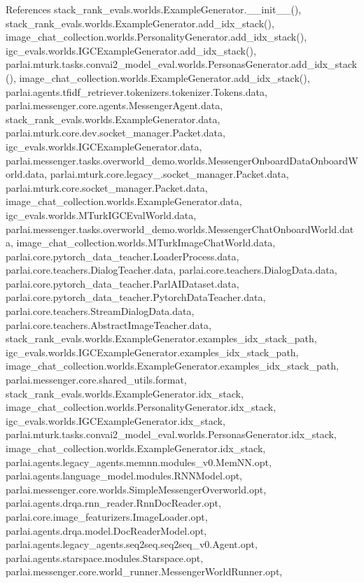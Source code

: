 References stack\+\_\+rank\+\_\+evals.\+worlds.\+Example\+Generator.\+\_\+\+\_\+init\+\_\+\+\_\+(), stack\+\_\+rank\+\_\+evals.\+worlds.\+Example\+Generator.\+add\+\_\+idx\+\_\+stack(), image\+\_\+chat\+\_\+collection.\+worlds.\+Personality\+Generator.\+add\+\_\+idx\+\_\+stack(), igc\+\_\+evals.\+worlds.\+I\+G\+C\+Example\+Generator.\+add\+\_\+idx\+\_\+stack(), parlai.\+mturk.\+tasks.\+convai2\+\_\+model\+\_\+eval.\+worlds.\+Personas\+Generator.\+add\+\_\+idx\+\_\+stack(), image\+\_\+chat\+\_\+collection.\+worlds.\+Example\+Generator.\+add\+\_\+idx\+\_\+stack(), parlai.\+agents.\+tfidf\+\_\+retriever.\+tokenizers.\+tokenizer.\+Tokens.\+data, parlai.\+messenger.\+core.\+agents.\+Messenger\+Agent.\+data, stack\+\_\+rank\+\_\+evals.\+worlds.\+Example\+Generator.\+data, parlai.\+mturk.\+core.\+dev.\+socket\+\_\+manager.\+Packet.\+data, igc\+\_\+evals.\+worlds.\+I\+G\+C\+Example\+Generator.\+data, parlai.\+messenger.\+tasks.\+overworld\+\_\+demo.\+worlds.\+Messenger\+Onboard\+Data\+Onboard\+World.\+data, parlai.\+mturk.\+core.\+legacy\+\_.\+socket\+\_\+manager.\+Packet.\+data, parlai.\+mturk.\+core.\+socket\+\_\+manager.\+Packet.\+data, image\+\_\+chat\+\_\+collection.\+worlds.\+Example\+Generator.\+data, igc\+\_\+evals.\+worlds.\+M\+Turk\+I\+G\+C\+Eval\+World.\+data, parlai.\+messenger.\+tasks.\+overworld\+\_\+demo.\+worlds.\+Messenger\+Chat\+Onboard\+World.\+data, image\+\_\+chat\+\_\+collection.\+worlds.\+M\+Turk\+Image\+Chat\+World.\+data, parlai.\+core.\+pytorch\+\_\+data\+\_\+teacher.\+Loader\+Process.\+data, parlai.\+core.\+teachers.\+Dialog\+Teacher.\+data, parlai.\+core.\+teachers.\+Dialog\+Data.\+data, parlai.\+core.\+pytorch\+\_\+data\+\_\+teacher.\+Parl\+A\+I\+Dataset.\+data, parlai.\+core.\+pytorch\+\_\+data\+\_\+teacher.\+Pytorch\+Data\+Teacher.\+data, parlai.\+core.\+teachers.\+Stream\+Dialog\+Data.\+data, parlai.\+core.\+teachers.\+Abstract\+Image\+Teacher.\+data, stack\+\_\+rank\+\_\+evals.\+worlds.\+Example\+Generator.\+examples\+\_\+idx\+\_\+stack\+\_\+path, igc\+\_\+evals.\+worlds.\+I\+G\+C\+Example\+Generator.\+examples\+\_\+idx\+\_\+stack\+\_\+path, image\+\_\+chat\+\_\+collection.\+worlds.\+Example\+Generator.\+examples\+\_\+idx\+\_\+stack\+\_\+path, parlai.\+messenger.\+core.\+shared\+\_\+utils.\+format, stack\+\_\+rank\+\_\+evals.\+worlds.\+Example\+Generator.\+idx\+\_\+stack, image\+\_\+chat\+\_\+collection.\+worlds.\+Personality\+Generator.\+idx\+\_\+stack, igc\+\_\+evals.\+worlds.\+I\+G\+C\+Example\+Generator.\+idx\+\_\+stack, parlai.\+mturk.\+tasks.\+convai2\+\_\+model\+\_\+eval.\+worlds.\+Personas\+Generator.\+idx\+\_\+stack, image\+\_\+chat\+\_\+collection.\+worlds.\+Example\+Generator.\+idx\+\_\+stack, parlai.\+agents.\+legacy\+\_\+agents.\+memnn.\+modules\+\_\+v0.\+Mem\+N\+N.\+opt, parlai.\+agents.\+language\+\_\+model.\+modules.\+R\+N\+N\+Model.\+opt, parlai.\+messenger.\+core.\+worlds.\+Simple\+Messenger\+Overworld.\+opt, parlai.\+agents.\+drqa.\+rnn\+\_\+reader.\+Rnn\+Doc\+Reader.\+opt, parlai.\+core.\+image\+\_\+featurizers.\+Image\+Loader.\+opt, parlai.\+agents.\+drqa.\+model.\+Doc\+Reader\+Model.\+opt, parlai.\+agents.\+legacy\+\_\+agents.\+seq2seq.\+seq2seq\+\_\+v0.\+Agent.\+opt, parlai.\+agents.\+starspace.\+modules.\+Starspace.\+opt, parlai.\+messenger.\+core.\+world\+\_\+runner.\+Messenger\+World\+Runner.\+opt, 